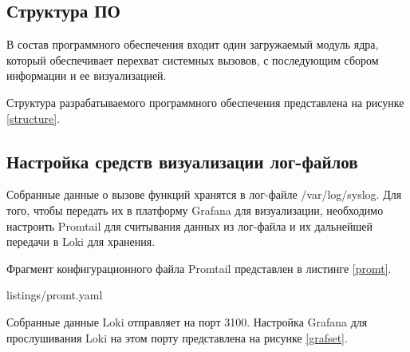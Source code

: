 \subsection{Структура ПО}

В состав программного обеспечения входит один загружаемый модуль ядра, который обеспечивает перехват системных вызовов, с последующим сбором информации и ее визуализацией.

\pagebreak

Структура разрабатываемого программного обеспечения представлена на рисунке \ref{structure}.

\begin{figure}[H]
\end{figure}

\subsection{Настройка средств визуализации лог-файлов}

Собранные данные о вызове функций хранятся в лог-файле /var/log/syslog. Для того, чтобы передать их в платформу Grafana для визуализации, необходимо настроить Promtail для считывания данных из лог-файла и их дальнейшей передачи в Loki для хранения.

Фрагмент конфигурационного файла Promtail представлен в листинге \ref{promt}.


{listings/promt.yaml}

\pagebreak

Собранные данные Loki отправляет на порт 3100. Настройка Grafana для прослушивания Loki на этом порту представлена на рисунке \ref{grafset}.

\begin{figure}[H]
\end{figure}

\pagebreak